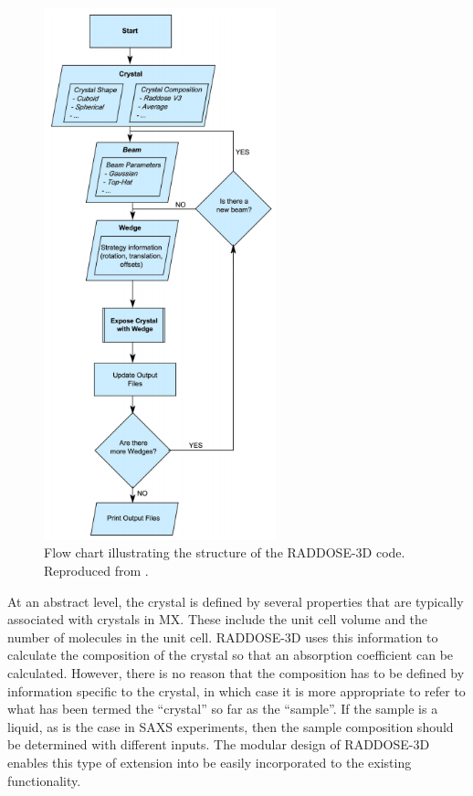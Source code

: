 \begin{figure}
    \centering
    \includegraphics[width=0.6\textwidth]{figures/saxs/raddose_flow.png}
    \caption[Flow diagram illustrating the structure of the RADDOSE-3D code.]{Flow chart illustrating the structure of the RADDOSE-3D code.
    Reproduced from \cite{zeldin2013}.}
    \label{fig:RADDOSE-3D Flow diagram}
\end{figure}

At an abstract level, the crystal is defined by several properties that are typically associated with crystals in MX.
These include the unit cell volume and the number of molecules in the unit cell.
RADDOSE-3D uses this information to calculate the composition of the crystal so that an absorption coefficient can be calculated.
However, there is no reason that the composition has to be defined by information specific to the crystal, in which case it is more appropriate to refer to what has been termed the ``crystal'' so far as the ``sample''.
If the sample is a liquid, as is the case in SAXS experiments, then the sample composition should be determined with different inputs.
The modular design of RADDOSE-3D enables this type of extension into be easily incorporated to the existing functionality.

